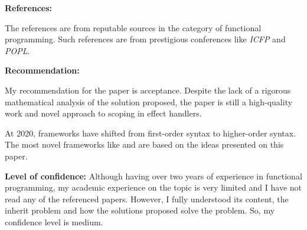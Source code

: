 \documentclass[12pt, a4paper]{article}
\begin{document}

\vspace{2ex}
{\normalsize \textbf{References:}}

The references are from reputable sources in the category of functional programming. Such references are from prestigious conferences like \textit{ICFP} and \textit{POPL}.


\vspace{2ex}
{\normalsize \textbf{Recommendation:}}

My recommendation for the paper is acceptance. Despite the lack of a rigorous mathematical analysis of the solution proposed, the paper is still a high-quality work and novel approach to scoping in effect handlers.

At 2020, frameworks have shifted from first-order syntax to higher-order syntax. The most novel frameworks like \cite{fused-effects} and \cite{polysemy} are based on the ideas presented on this paper.


\vspace{2ex}
{\normalsize \textbf{Level of confidence:}}
Although having over two years of experience in functional programming, my academic experience on the topic is very limited and I have not read any of the referenced papers. However, I fully understood its content, the inherit problem and how the solutions proposed solve the problem. So, my confidence level is medium.




\end{document}

